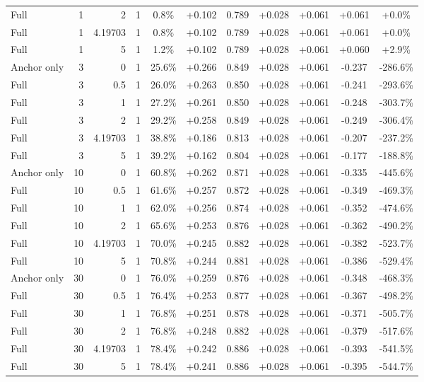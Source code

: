 \begin{table}[htbp]
\begin{tabular}{lrrrccccccc}
Full & 1 & 2 & 1 & 0.8\% & +0.102 & 0.789 & +0.028 & +0.061 & +0.061 & +0.0\% \\
Full & 1 & 4.19703 & 1 & 0.8\% & +0.102 & 0.789 & +0.028 & +0.061 & +0.061 & +0.0\% \\
Full & 1 & 5 & 1 & 1.2\% & +0.102 & 0.789 & +0.028 & +0.061 & +0.060 & +2.9\% \\
Anchor only & 3 & 0 & 1 & 25.6\% & +0.266 & 0.849 & +0.028 & +0.061 & -0.237 & -286.6\% \\
Full & 3 & 0.5 & 1 & 26.0\% & +0.263 & 0.850 & +0.028 & +0.061 & -0.241 & -293.6\% \\
Full & 3 & 1 & 1 & 27.2\% & +0.261 & 0.850 & +0.028 & +0.061 & -0.248 & -303.7\% \\
Full & 3 & 2 & 1 & 29.2\% & +0.258 & 0.849 & +0.028 & +0.061 & -0.249 & -306.4\% \\
Full & 3 & 4.19703 & 1 & 38.8\% & +0.186 & 0.813 & +0.028 & +0.061 & -0.207 & -237.2\% \\
Full & 3 & 5 & 1 & 39.2\% & +0.162 & 0.804 & +0.028 & +0.061 & -0.177 & -188.8\% \\
Anchor only & 10 & 0 & 1 & 60.8\% & +0.262 & 0.871 & +0.028 & +0.061 & -0.335 & -445.6\% \\
Full & 10 & 0.5 & 1 & 61.6\% & +0.257 & 0.872 & +0.028 & +0.061 & -0.349 & -469.3\% \\
Full & 10 & 1 & 1 & 62.0\% & +0.256 & 0.874 & +0.028 & +0.061 & -0.352 & -474.6\% \\
Full & 10 & 2 & 1 & 65.6\% & +0.253 & 0.876 & +0.028 & +0.061 & -0.362 & -490.2\% \\
Full & 10 & 4.19703 & 1 & 70.0\% & +0.245 & 0.882 & +0.028 & +0.061 & -0.382 & -523.7\% \\
Full & 10 & 5 & 1 & 70.8\% & +0.244 & 0.881 & +0.028 & +0.061 & -0.386 & -529.4\% \\
Anchor only & 30 & 0 & 1 & 76.0\% & +0.259 & 0.876 & +0.028 & +0.061 & -0.348 & -468.3\% \\
Full & 30 & 0.5 & 1 & 76.4\% & +0.253 & 0.877 & +0.028 & +0.061 & -0.367 & -498.2\% \\
Full & 30 & 1 & 1 & 76.8\% & +0.251 & 0.878 & +0.028 & +0.061 & -0.371 & -505.7\% \\
Full & 30 & 2 & 1 & 76.8\% & +0.248 & 0.882 & +0.028 & +0.061 & -0.379 & -517.6\% \\
Full & 30 & 4.19703 & 1 & 78.4\% & +0.242 & 0.886 & +0.028 & +0.061 & -0.393 & -541.5\% \\
Full & 30 & 5 & 1 & 78.4\% & +0.241 & 0.886 & +0.028 & +0.061 & -0.395 & -544.7\% \\

\end{tabular}
\end{table}
